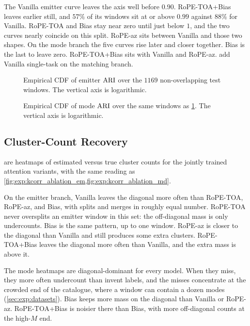 The Vanilla emitter curve leaves the axis well before $0.90$.
RoPE-TOA+Bias leaves earlier still, and $57\%$ of its windows sit at or above $0.99$ against $88\%$ for Vanilla.
RoPE-TOA and Bias stay near zero until just below $1$, and the two curves nearly coincide on this split.
RoPE-az sits between Vanilla and those two shapes.
On the mode branch the five curves rise later and closer together. Bias is the last to leave zero. RoPE-TOA+Bias sits with Vanilla and RoPE-az.
 add Vanilla single-task on the matching branch.

\begin{figure}[H]
  \centering
  \caption{Empirical CDF of emitter $\mathrm{ARI}$ over the $1169$ non-overlapping test windows. The vertical axis is logarithmic.}
  \label{fig:exp:hist_em}
\end{figure}

\begin{figure}[H]
  \centering
  \caption{Empirical CDF of mode $\mathrm{ARI}$ over the same windows as \cref{fig:exp:hist_em}. The vertical axis is logarithmic.}
  \label{fig:exp:hist_md}
\end{figure}

\subsection{Cluster-Count Recovery}\label{sec:exp:results:kcorr}

 are heatmaps of estimated versus true cluster counts for the jointly trained attention variants, with the same reading as \cref{fig:exp:kcorr_ablation_em,fig:exp:kcorr_ablation_md}.

On the emitter branch, Vanilla leaves the diagonal more often than RoPE-TOA, RoPE-az, and Bias, with splits and merges in roughly equal number.
RoPE-TOA never oversplits an emitter window in this set: the off-diagonal mass is only undercounts.
Bias is the same pattern, up to one window.
RoPE-az is closer to the diagonal than Vanilla and still produces some extra clusters.
RoPE-TOA+Bias leaves the diagonal more often than Vanilla, and the extra mass is above it.

The mode heatmaps are diagonal-dominant for every model.
When they miss, they more often undercount than invent labels, and the misses concentrate at the crowded end of the catalogue, where a window can contain a dozen modes (\cref{sec:exp:datasets}).
Bias keeps more mass on the diagonal than Vanilla or RoPE-az.
RoPE-TOA+Bias is noisier there than Bias, with more off-diagonal counts at the high-$M$ end.

